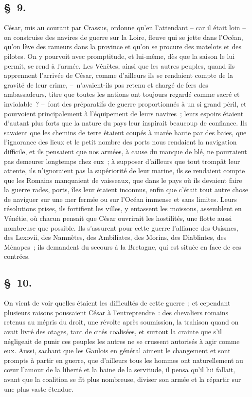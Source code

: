 \documentclass[french,twoside]{book} %
\begin{document}
\subsection[{§ 9.}]{ \textsc{§ 9.} }
\noindent César, mis au courant par Crassus, ordonne qu’en l’attendant – car il était loin – on construise des navires de guerre sur la Loire, fleuve qui se jette dans l’Océan, qu’on lève des rameurs dans la province et qu’on se procure des matelots et des pilotes. On y pourvoit avec promptitude, et lui-même, dès que la saison le lui permit, se rend à l’armée. Les Vénètes, ainsi que les autres peuples, quand ils apprennent l’arrivée de César, comme d’ailleurs ils se rendaient compte de la gravité de leur crime, – n’avaient-ils pas retenu et chargé de fers des ambassadeurs, titre que toutes les nations ont toujours regardé comme sacré et inviolable ? – font des préparatifs de guerre proportionnés à un si grand péril, et pourvoient principalement à l’équipement de leurs navires ; leurs espoirs étaient d’autant plus forts que la nature du pays leur inspirait beaucoup de confiance. Ils savaient que les chemins de terre étaient coupés à marée haute par des baies, que l’ignorance des lieux et le petit nombre des ports nous rendaient la navigation difficile, et ils pensaient que nos armées, à cause du manque de blé, ne pourraient pas demeurer longtemps chez eux ; à supposer d’ailleurs que tout trompât leur attente, ils n’ignoraient pas la supériorité de leur marine, ils se rendaient compte que les Romains manquaient de vaisseaux, que dans le pays où ils devaient faire la guerre rades, ports, îles leur étaient inconnus, enfin que c’était tout autre chose de naviguer sur une mer fermée ou sur l’Océan immense et sans limites. Leurs résolutions prises, ils fortifient les villes, y entassent les moissons, assemblent en Vénétie, où chacun pensait que César ouvrirait les hostilités, une flotte aussi nombreuse que possible. Ils s’assurent pour cette guerre l’alliance des Osismes, des Lexovii, des Namnètes, des Ambiliates, des Morins, des Diablintes, des Ménapes ; ils demandent du secours à la Bretagne, qui est située en face de ces contrées.
\subsection[{§ 10.}]{ \textsc{§ 10.} }
\noindent On vient de voir quelles étaient les difficultés de cette guerre ; et cependant plusieurs raisons poussaient César à l’entreprendre : des chevaliers romains retenus au mépris du droit, une révolte après soumission, la trahison quand on avait livré des otages, tant de cités coalisées, et surtout la crainte que s’il négligeait de punir ces peuples les autres ne se crussent autorisés à agir comme eux. Aussi, sachant que les Gaulois en général aiment le changement et sont prompts à partir en guerre, que d’ailleurs tous les hommes ont naturellement au cœur l’amour de la liberté et la haine de la servitude, il pensa qu’il lui fallait, avant que la coalition se fît plus nombreuse, diviser son armée et la répartir sur une plus vaste étendue.
\end{document}
